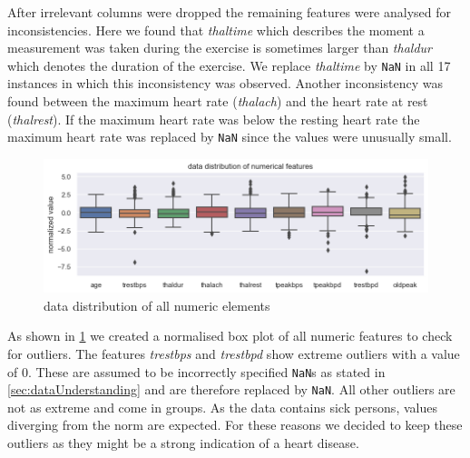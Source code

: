 After irrelevant columns were dropped the remaining features were analysed for inconsistencies. Here we found that \textit{thaltime} which describes the moment a measurement was taken during the exercise is sometimes larger than \textit{thaldur} which denotes the duration of the exercise. We replace \textit{thaltime} by \texttt{NaN} in all 17 instances in which this inconsistency was observed. Another inconsistency was found between the maximum heart rate (\textit{thalach}) and the heart rate at rest (\textit{thalrest}). If the maximum heart rate was below the resting heart rate the maximum heart rate was replaced by \texttt{NaN} since the values were unusually small.

\begin{figure}[h]
	\centering
	\includegraphics[width=\textwidth]{images/dataDistribution.png}
	\caption{data distribution of all numeric elements}
	\label{fig:dataDistribution}
\end{figure}
As shown in \cref{fig:dataDistribution} we created a normalised box plot of all numeric features to check for outliers. The features \textit{trestbps} and \textit{trestbpd} show extreme outliers with a value of 0. These are assumed to be incorrectly specified \texttt{NaN}s as stated in \cref{sec:dataUnderstanding} and are therefore replaced by \texttt{NaN}. All other outliers are not as extreme and come in groups. As the data contains sick persons, values diverging from the norm are expected. For these reasons we decided to keep these outliers as they might be a strong indication of a heart disease.

